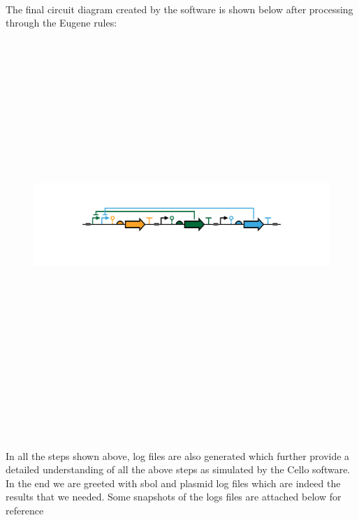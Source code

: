 \documentclass[11pt]{article}
\begin{document}
\\[\baselineskip]   
The final circuit diagram created by the software is shown below after processing through the Eugene rules:
\begin{figure}[ht!]
\centering
\includegraphics[width=13cm,height=14cm,keepaspectratio]{ex_output.png}
\label{Circuit diagram}
\end{figure}
\\[\baselineskip]  
\\[\baselineskip]  
In all the steps shown above, log files are also generated which further provide a detailed understanding of all the above steps as simulated by the Cello software.
In the end we are greeted with sbol and plasmid log files which are indeed the results that we needed. Some snapshots of the logs files are attached below for reference
 \\[\baselineskip]   
 \\[\baselineskip]   
\end{document}
